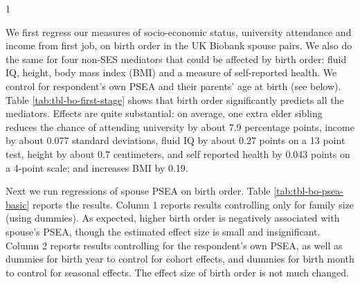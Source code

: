 \documentclass[
  12pt,
]{article}
\theoremstyle{definition}
\theoremstyle{definition}
\theoremstyle{definition}
\theoremstyle{definition}
\theoremstyle{remark}
\begin{document}
\begin{table}[ht]
\begin{centerbox}
\begin{threeparttable}
\begin{tabularx}{1\textwidth}
 \tabularnewline[-0.5pt]


\hhline{}
\end{tabularx}
\end{threeparttable}\par\end{centerbox}

\end{table}
 

We first regress our measures of socio-economic status, university attendance
and income from first job, on birth order in the UK Biobank spouse pairs. We also do
the same for four non-SES mediators that could be affected by birth order: fluid
IQ, height, body mass index (BMI) and a measure of self-reported health. We
control for respondent's own PSEA and their parents' age at birth (see below). Table
\ref{tab:tbl-bo-first-stage} shows that birth order significantly predicts all
the mediators. Effects are quite substantial: on average, one extra elder
sibling reduces the chance of attending university by about
7.9 percentage points, income by about
0.077 standard deviations, fluid IQ by about
0.27 points on a 13 point test, height by about
0.7 centimeters, and self reported health by
0.043 points on a 4-point scale; and increases BMI by
0.19.

Next we run regressions of spouse PSEA on birth order.
Table \ref{tab:tbl-bo-psea-basic} reports the results. Column 1
reports results controlling only for family size (using dummies). As expected,
higher birth order is negatively associated with spouse's PSEA, though the
estimated effect size is small and insignificant. Column 2 reports results
controlling for the respondent's own PSEA, as well as dummies for birth year to
control for cohort effects, and dummies for birth month to control for
seasonal effects. The effect size of birth order is not much changed.
\end{document}
